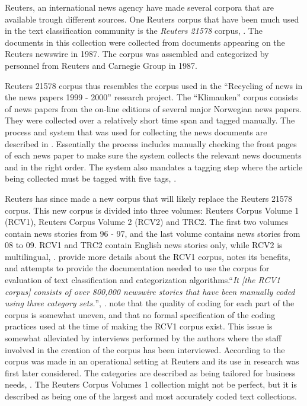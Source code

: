 Reuters, an international news agency have made several corpora that are available trough different sources. One Reuters corpus that have been much used in the text classification community is the \textit{Reuters 21578} corpus, \parencite{Lewis2004a}. The documents in this collection were collected from documents appearing on the Reuters newswire in 1987. The corpus was assembled and categorized by personnel from Reuters and Carnegie Group in 1987.

Reuters 21578 corpus thus resembles the corpus used in the ``Recycling of news in the news papers 1999 - 2000'' research project. The ``Klimauken'' corpus consists of news papers from the on-line editions of several major Norwegian news papers. They were collected over a relatively short time span and tagged manually. The process and system that was used for collecting the news documents are described in \cite{Losnegaard}. Essentially the process includes manually checking the front pages of each news paper to make sure the system collects the relevant news documents and in the right order. The system also mandates a tagging step where the article being collected must be tagged with five tags, \parencite{Losnegaard}.

Reuters has since made a new corpus that will likely replace the Reuters 21578 corpus. This new corpus is divided into three volumes: Reuters Corpus Volume 1 (RCV1), Reuters Corpus Volume 2 (RCV2) and TRC2. The first two volumes contain news stories from 96 - 97, and the last volume contains news stories from 08 to 09. RCV1 and TRC2 contain English news stories only, while RCV2 is multilingual, \parencite{NationalInstituteofStandardsandTechnology2004}. \cite{Lewis2004} provide more details about the RCV1 corpus, notes its benefits, and attempts to provide the documentation needed to use the corpus for evaluation of text classification and categorization algorithms.``\textit{It [the RCV1 corpus] consists of over 800,000 newswire stories that have been manually coded using three category sets.}'', \parencite[][362]{Lewis2004}. \citeauthor{Lewis2004} note that the quality of coding for each part of the corpus is somewhat uneven, and that no formal specification of the coding practices used at the time of making the RCV1 corpus exist. This issue is somewhat alleviated by interviews performed by the authors where the staff involved in the creation of the corpus has been interviewed. According to \citeauthor{Lewis2004} the corpus was made in an operational setting at Reuters and its use in research was first later considered. The categories are described as being tailored for business needs, \parencite{Lewis2004}. The Reuters Corpus Volumes 1 collection might not be perfect, but it is described as being one of the largest and most accurately coded text collections.

